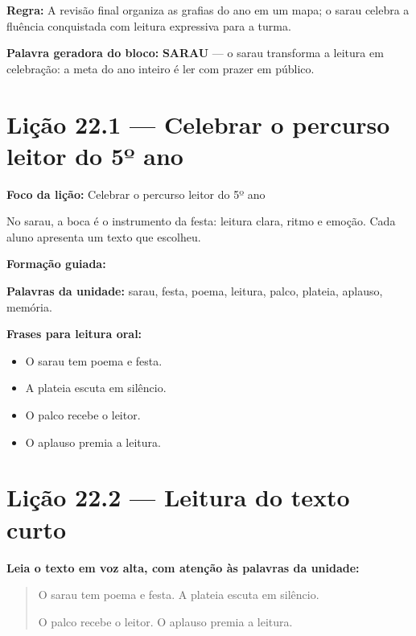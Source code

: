 \textbf{Regra:} A revisão final organiza as grafias do ano em um mapa; o sarau celebra a fluência conquistada com leitura expressiva para a turma.

\textbf{Palavra geradora do bloco:} \textbf{SARAU} --- o sarau transforma a leitura em celebração: a meta do ano inteiro é ler com prazer em público.

\section{Lição 22.1 --- Celebrar o percurso leitor do 5º ano}

\textbf{Foco da lição:} Celebrar o percurso leitor do 5º ano


\begin{boquinha}
No sarau, a boca é o instrumento da festa: leitura clara, ritmo e emoção. Cada aluno apresenta um texto que escolheu.
\end{boquinha}

\noindent\textbf{Formação guiada:}

\begin{center}
\end{center}

\noindent\textbf{Palavras da unidade:} sarau, festa, poema, leitura, palco, plateia, aplauso, memória.

\noindent\textbf{Frases para leitura oral:}
\begin{itemize}[leftmargin=1.6em]
  \item O sarau tem poema e festa.
  \item A plateia escuta em silêncio.
  \item O palco recebe o leitor.
  \item O aplauso premia a leitura.
\end{itemize}

\section{Lição 22.2 --- Leitura do texto curto}

\noindent\textbf{Leia o texto em voz alta, com atenção às palavras da unidade:}


\begin{quote}
O sarau tem poema e festa. A plateia escuta em silêncio.

O palco recebe o leitor. O aplauso premia a leitura.
\end{quote}

